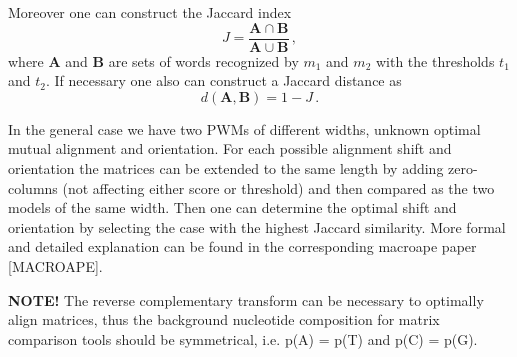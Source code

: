 Moreover one can construct the Jaccard index 
$$J = \frac{\mathbf{A}\cap \mathbf{B}}{\mathbf{A}\cup \mathbf{B}}\,, $$
where $\mathbf{A}$ and $\mathbf{B}$ are 
sets of words recognized by $m_1$ and $m_2$ with the thresholds $t_1$ and $t_2$. If necessary one also can 
construct a Jaccard distance as $$d(\mathbf{A},\mathbf{B}) = 1 - J\,.$$

In the general case we have two PWMs of different widths, unknown optimal mutual 
alignment and orientation. For each possible alignment shift and orientation the matrices can be 
extended to the same length by adding zero-columns (not affecting either score or threshold) 
and then compared as the two models of the same width. Then one can determine the optimal 
shift and orientation by selecting the case with the highest Jaccard similarity. More formal and 
detailed explanation can be found in the corresponding macroape paper [MACROAPE].

\textbf{NOTE!} The reverse complementary transform can be necessary to optimally align matrices, 
thus the background nucleotide composition for matrix comparison tools should be symmetrical, i.e. p(A) = p(T) and p(C) = p(G).

